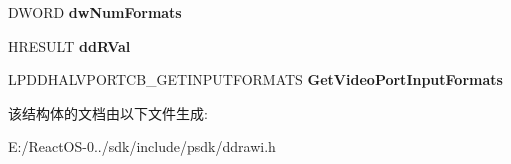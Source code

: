\begin{DoxyCompactItemize}
D\+W\+O\+RD {\bfseries dw\+Num\+Formats}
\item 
\mbox{\label{struct___d_d_h_a_l___g_e_t_v_p_o_r_t_i_n_p_u_t_f_o_r_m_a_t_d_a_t_a_a93e6128469d665911c998b17f99e6a44}} 
H\+R\+E\+S\+U\+LT {\bfseries dd\+R\+Val}
\item 
\mbox{\label{struct___d_d_h_a_l___g_e_t_v_p_o_r_t_i_n_p_u_t_f_o_r_m_a_t_d_a_t_a_adba56a67635121750f825a68dd078afa}} 
L\+P\+D\+D\+H\+A\+L\+V\+P\+O\+R\+T\+C\+B\+\_\+\+G\+E\+T\+I\+N\+P\+U\+T\+F\+O\+R\+M\+A\+TS {\bfseries Get\+Video\+Port\+Input\+Formats}
\end{DoxyCompactItemize}


该结构体的文档由以下文件生成\+:\begin{DoxyCompactItemize}
\item 
E\+:/\+React\+O\+S-\/0../sdk/include/psdk/ddrawi.\+h\end{DoxyCompactItemize}
